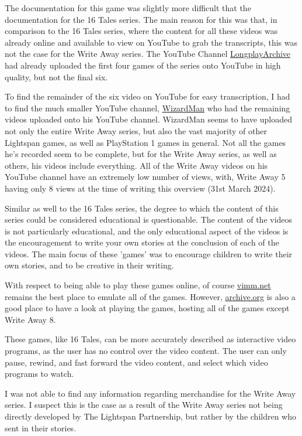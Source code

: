 The documentation for this game was slightly more difficult that the documentation for the 16 Tales series. The main reason for this was that, in comparison to the 16 Tales series, where the content for all these videos was already online and available to view on YouTube to grab the transcripts, this was not the case for the Write Away series. The YouTube Channel \href{https://www.youtube.com/@longplayarchive}{LongplayArchive} had already uploaded the first four games of the series onto YouTube in high quality, but not the final six.

To find the remainder of the six video on YouTube for easy transcription, I had to find the much smaller YouTube channel, \href{https://www.youtube.com/@WizardmanTonight}{WizardMan} who had the remaining videos uploaded onto his YouTube channel. WizardMan seems to have uploaded not only the entire Write Away series, but also the vast majority of other Lightspan games, as well as PlayStation 1 games in general. Not all the games he's recorded seem to be complete, but for the Write Away series, as well as others, his videos include everything. All of the Write Away videos on his YouTube channel have an extremely low number of views, with, Write Away 5 having only 8 views at the time of writing this overview (31st March 2024).

Similar as well to the 16 Tales series, the degree to which the content of this series could be considered educational is questionable. The content of the videos is not particularly educational, and the only educational aspect of the videos is the encouragement to write your own stories at the conclusion of each of the videos. The main focus of these 'games' was to encourage children to write their own stories, and to be creative in their writing.

With respect to being able to play these games online, of course \href{https://vimm.net}{vimm.net} remains the best place to emulate all of the games. However, \href{https://archive.org}{archive.org} is also a good place to have a look at playing the games, hosting all of the games except Write Away 8.

These games, like 16 Tales, can be more accurately described as interactive video programs, as the user has no control over the video content. The user can only pause, rewind, and fast forward the video content, and select which video programs to watch.

I was not able to find any information regarding merchandise for the Write Away series. I suspect this is the case as a result of the Write Away series not being directly developed by The Lightspan Partnership, but rather by the children who sent in their stories.

